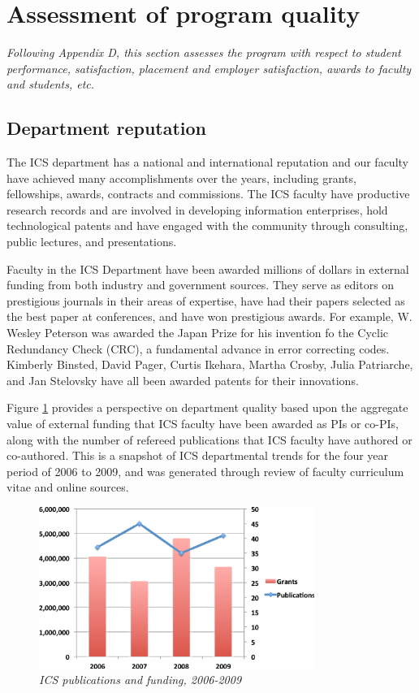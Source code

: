 \documentclass[12pt]{article}
\begin{document}
\section{Assessment of program quality}

{\em Following Appendix D, this section assesses the program with respect
  to student performance, satisfaction, placement and employer
  satisfaction, awards to faculty and students, etc.}

\subsection{Department reputation}
\label{sec:reputation}

The ICS department has a national and international reputation and our
faculty have achieved many accomplishments over the years, including
grants, fellowships, awards, contracts and commissions. The ICS faculty
have productive research records and are involved in developing information
enterprises, hold technological patents and have engaged with the community
through consulting, public lectures, and presentations. 

Faculty in the ICS Department have been awarded millions of dollars in
external funding from both industry and government sources.  They serve as
editors on prestigious journals in their areas of expertise, have had their
papers selected as the best paper at conferences, and have won prestigious
awards.  For example, W. Wesley Peterson was awarded the Japan Prize for
his invention fo the Cyclic Redundancy Check (CRC), a fundamental advance
in error correcting codes. Kimberly Binsted, David Pager, Curtis Ikehara,
Martha Crosby, Julia Patriarche, and Jan Stelovsky have all been awarded
patents for their innovations.

Figure \ref{fig:pubs-and-grants} provides a perspective on department
quality based upon the aggregate value of external funding that ICS faculty
have been awarded as PIs or co-PIs, along with the number of refereed
publications that ICS faculty have authored or co-authored.  This is a
snapshot of ICS departmental trends for the four year period of 2006 to
2009, and was generated through review of faculty curriculum vitae and
online sources.

\begin{figure}[ht]
  \center
  \includegraphics[width=0.8\textwidth]{pubs-and-grants.eps}
  \caption{\em \small ICS publications and funding, 2006-2009}
  \label{fig:pubs-and-grants}
\end{figure} 
\end{document}

